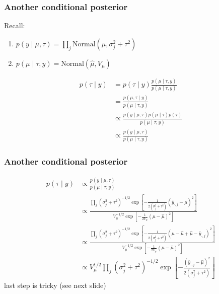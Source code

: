 \documentclass{beamer}
\begin{document}
\begin{frame}
\frametitle{Another conditional posterior }

Recall:
\begin{enumerate}
\item $p(y \mid \mu, \tau) = \prod_j \text{Normal}(\mu, \sigma^2_j + \tau^2)$
\item $p(\mu \mid \tau, y) = \text{Normal}(\hat{\mu}, V_{\mu})$
\end{enumerate}


\begin{align*}
p( \tau \mid y) &= p( \tau \mid y) \frac{p(\mu \mid \tau, y)  }{ p(\mu \mid \tau, y) } \\
&=  \frac{p(\mu, \tau\mid y)  }{ p(\mu \mid \tau, y) } \\
&\propto  \frac{ p(y \mid \mu, \tau) p(\mu \mid \tau) p(\tau) }{ p(\mu \mid \tau, y) } \\
&\propto  \frac{ p(y \mid \mu, \tau)  }{ p(\mu \mid \tau, y) } 
\end{align*}



\end{frame}


\begin{frame}
\frametitle{Another conditional posterior }


\begin{align*}
p(\tau \mid y) &\propto \frac{ p(y \mid \mu, \tau)  }{ p(\mu \mid \tau, y) } \\
&\propto \frac{\prod_j (\sigma^2_j + \tau^2)^{-1/2} \exp\left[ -\frac{1}{2 (\sigma^2_j + \tau^2) } (\bar{y}_{\cdot,j} - \mu)^2\right] }{ V_{\mu}^{-1/2} \exp\left[ -\frac{1}{2 V_{\mu} } (\mu -\hat{\mu} )^2\right] } \\
&\propto \frac{\prod_j (\sigma^2_j + \tau^2)^{-1/2} \exp\left[ -\frac{1}{2 (\sigma^2_j + \tau^2) } (\mu -  \hat{\mu} + \hat{\mu} - \bar{y}_{\cdot,j}  )^2\right] }{ V_{\mu}^{-1/2} \exp\left[ -\frac{1}{2 V_{\mu} } (\mu -\hat{\mu} )^2\right] } \\
&\propto V_{\mu}^{1/2} \prod_{j} (\sigma^2_j + \tau^2)^{-1/2} \exp\left[ -\frac{ (\bar{y}_{\cdot,j} - \hat{\mu})^2 }{2(\sigma^2_j + \tau^2)}\right]
\end{align*}
last step is tricky (see next slide)


\end{frame}
\end{document}
